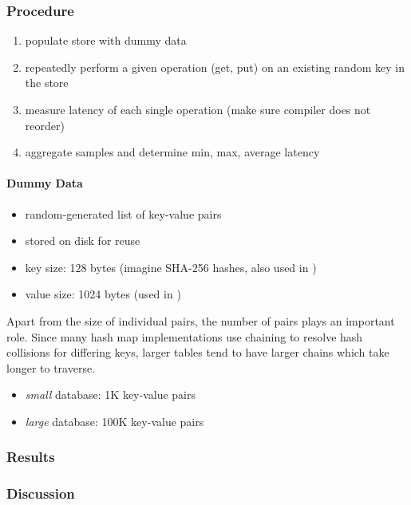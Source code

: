 \subsubsection{Procedure}

\begin{enumerate}
    \item populate store with dummy data
    \item repeatedly perform a given operation (get, put) on an existing random key in the store
    \item measure latency of each single operation (make sure compiler does not reorder)
    \item aggregate samples and determine min, max, average latency
\end{enumerate}

\paragraph{Dummy Data}

\begin{itemize}
    \item random-generated list of key-value pairs
    \item stored on disk for reuse
    \item key size: 128 bytes (imagine SHA-256 hashes, also used in \cite{bailey2013exploring})
    \item value size: 1024 bytes (used in \cite{bailey2013exploring})
\end{itemize}

Apart from the size of individual pairs, the number of pairs plays an important
role. Since many hash map implementations use chaining to resolve hash
collisions for  differing keys, larger tables tend to have larger chains which
take longer to traverse.

\begin{itemize}
    \item \emph{small} database: 1K key-value pairs
    \item \emph{large} database: 100K key-value pairs
\end{itemize}

\subsubsection{Results}


\subsubsection{Discussion}

